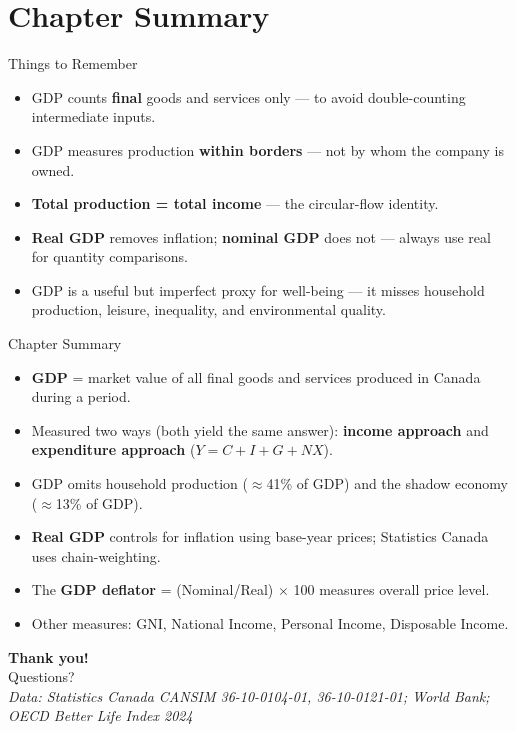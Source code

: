 \documentclass[aspectratio=169]{beamer}
\begin{document}
\section*{Chapter Summary}

\begin{frame}{Things to Remember}
\transfade
\begin{itemize}[<+->]
  \item GDP counts \textbf{final} goods and services only --- to avoid double-counting intermediate inputs.
  \item GDP measures production \textbf{within borders} --- not by whom the company is owned.
  \item \textbf{Total production = total income} --- the circular-flow identity.
  \item \textbf{Real GDP} removes inflation; \textbf{nominal GDP} does not --- always use real for quantity comparisons.
  \item GDP is a useful but imperfect proxy for well-being --- it misses household production, leisure, inequality, and environmental quality.
\end{itemize}
\end{frame}

\begin{frame}{Chapter Summary}
\transfade
\begin{itemize}[<+->]
  \item \textbf{GDP} = market value of all final goods and services produced in Canada during a period.
  \item Measured two ways (both yield the same answer): \textbf{income approach} and \textbf{expenditure approach} ($Y = C + I + G + NX$).
  \item GDP omits household production ($\approx$41\% of GDP) and the shadow economy ($\approx$13\% of GDP).
  \item \textbf{Real GDP} controls for inflation using base-year prices; Statistics Canada uses chain-weighting.
  \item The \textbf{GDP deflator} = (Nominal/Real) $\times$ 100 measures overall price level.
  \item Other measures: GNI, National Income, Personal Income, Disposable Income.
\end{itemize}
\end{frame}

\begin{frame}
\centering
\Huge \textbf{Thank you!}\\[1em]
\normalsize Questions?\\[0.5em]
\small\itshape Data: Statistics Canada CANSIM 36-10-0104-01, 36-10-0121-01; World Bank; OECD Better Life Index 2024
\end{frame}
\end{document}
